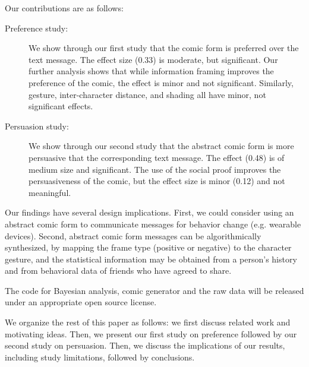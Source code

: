Our contributions are as follows:
\begin{description}
  \item[Preference study:] We show through our first study that the comic form is preferred over the text message. The effect size (0.33) is moderate, but significant. Our further analysis shows that while information framing improves the preference of the comic, the effect is minor and not significant. Similarly, gesture, inter-character distance, and shading all have minor, not significant effects.
  \item[Persuasion study:] We show through our second study that the abstract comic form is more persuasive that the corresponding text message. The effect (0.48) is of medium size and significant. The use of the social proof improves the persuasiveness of the comic, but the effect size is minor (0.12) and not meaningful.
\end{description}

Our findings have several design implications. First, we could consider using an abstract comic form to communicate messages for behavior change (e.g. wearable devices). Second, abstract comic form messages can be algorithmically synthesized, by mapping the frame type (positive or negative) to the character gesture, and the statistical information may be obtained from a person's history and from behavioral data of friends who have agreed to share.

The code for Bayesian analysis, comic generator and the raw data will be released under an appropriate open source license.




We organize the rest of this paper as follows: we first discuss related work and motivating ideas. Then, we present our first study on preference followed by our second study on persuasion. Then, we discuss the implications of our results, including study limitations, followed by conclusions.
